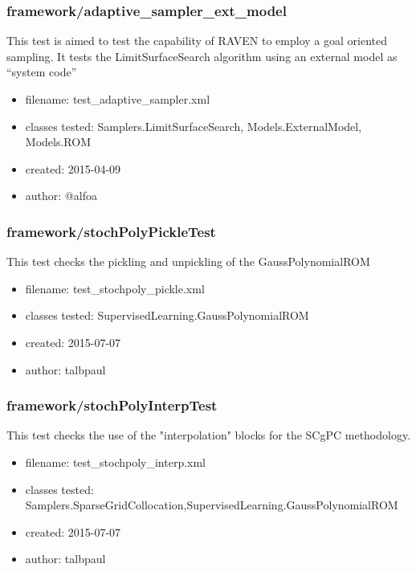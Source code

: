     \subsubsection{framework/adaptive\_sampler\_ext\_model}
      
        This  test is aimed to test the capability of RAVEN to employ a goal oriented sampling. It tests the
        LimitSurfaceSearch algorithm using an external model as ``system code''
    
      \begin{itemize}
          \item filename: test\_adaptive\_sampler.xml
          \item classes tested: Samplers.LimitSurfaceSearch, Models.ExternalModel, Models.ROM
          \item created: 2015-04-09
          \item author: @alfoa
      \end{itemize}
    \subsubsection{framework/stochPolyPickleTest}
      
      This test checks the pickling and unpickling of the GaussPolynomialROM
    
      \begin{itemize}
          \item filename: test\_stochpoly\_pickle.xml
          \item classes tested: SupervisedLearning.GaussPolynomialROM
          \item created: 2015-07-07
          \item author: talbpaul
      \end{itemize}
    \subsubsection{framework/stochPolyInterpTest}
      
      This test checks the use of the "interpolation" blocks for the SCgPC methodology.
    
      \begin{itemize}
          \item filename: test\_stochpoly\_interp.xml
          \item classes tested: Samplers.SparseGridCollocation,SupervisedLearning.GaussPolynomialROM
          \item created: 2015-07-07
          \item author: talbpaul
      \end{itemize}
